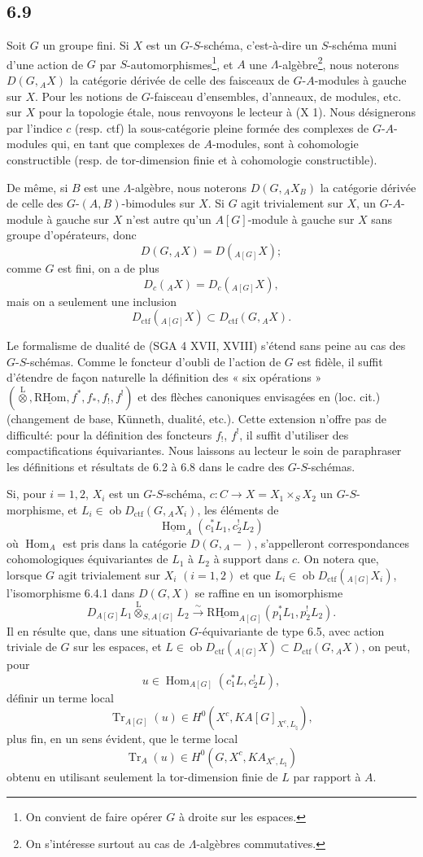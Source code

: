 \documentclass[11pt]{article}
\DeclareMathOperator{\Hom}{Hom}
\providecommand{\RHom}{\mathrm{RHom}}
\providecommand{\uRHom}{\underline{\RHom}}
\providecommand{\uHom}{\underline{\Hom}}
\providecommand{\Tr}{\operatorname{Tr}}
\providecommand{\Tr}{\operatorname{Tr}}
\providecommand{\lten}{\overset{\mathrm L}{\otimes}}
\providecommand{\Ob}{\operatorname{ob}}
\providecommand{\Tr}{\operatorname{Tr}}
\providecommand{\RHom}{\mathrm{RHom}}
\providecommand{\Hom}{\operatorname{Hom}}
\providecommand{\lten}{\overset{\mathrm L}{\otimes}}
\providecommand{\RHom}{\mathrm R\mathcal{H}om}
\providecommand{\lten}{\overset{\mathrm L}{\otimes}}
\providecommand{\Ob}{\operatorname{ob}}
\providecommand{\Tr}{\operatorname{Tr}}
\providecommand{\lten}{\overset{\mathrm L}{\otimes}}
\providecommand{\lten}{\overset{\mathrm L}{\otimes}}
\providecommand{\Ob}{\operatorname{Ob}}
\providecommand{\lten}{\overset{\mathrm L}{\otimes}}
\providecommand{\RHom}{\mathrm{RHom}}
\providecommand{\Hom}{\operatorname{Hom}}
\providecommand{\Tr}{\operatorname{Tr}}
\providecommand{\Ob}{\operatorname{ob}}
\providecommand{\Ob}{\operatorname{Ob}}
\providecommand{\lten}{\overset{\mathrm L}{\otimes}}
\begin{document}
\subsection*{6.9}
Soit $G$ un groupe fini. Si $X$ est un $G$-$S$-schéma, c'est-à-dire un $S$-schéma muni d'une action de $G$ par $S$-automorphismes\footnote{On convient de faire opérer $G$ à droite sur les espaces.}, et $A$ une $\Lambda$-algèbre\footnote{On s'intéresse surtout au cas de $\Lambda$-algèbres commutatives.}, nous noterons $D(G,{}_AX)$ la catégorie dérivée de celle des faisceaux de $G$-$A$-modules à gauche sur $X$. Pour les notions de $G$-faisceau d'ensembles, d'anneaux, de modules, etc. sur $X$ pour la topologie étale, nous renvoyons le lecteur à (X 1). Nous désignerons par l'indice $c$ (resp. ctf) la sous-catégorie pleine formée des complexes de $G$-$A$-modules qui, en tant que complexes de $A$-modules, sont à cohomologie constructible (resp. de tor-dimension finie et à cohomologie constructible).

De même, si $B$ est une $\Lambda$-algèbre, nous noterons $D(G,{}_AX_B)$ la catégorie dérivée de celle des $G$-$(A,B)$-bimodules sur $X$. Si $G$ agit trivialement sur $X$, un $G$-$A$-module à gauche sur $X$ n'est autre qu'un $A[G]$-module à gauche sur $X$ sans groupe d'opérateurs, donc
\[
D(G,{}_AX)=D({}_{A[G]}X);
\]
comme $G$ est fini, on a de plus
\[
D_c({}_AX)=D_c({}_{A[G]}X),
\]
mais on a seulement une inclusion
\[
D_{\mathrm{ctf}}({}_{A[G]}X)\subset D_{\mathrm{ctf}}(G,{}_AX).
\]

Le formalisme de dualité de (SGA 4 XVII, XVIII) s'étend sans peine au cas des $G$-$S$-schémas. Comme le foncteur d'oubli de l'action de $G$ est fidèle, il suffit d'étendre de façon naturelle la définition des « six opérations » $(\lten,\uRHom,f^*,f_*,f_!,f^!)$ et des flèches canoniques envisagées en (loc. cit.) (changement de base, Künneth, dualité, etc.). Cette extension n'offre pas de difficulté: pour la définition des foncteurs $f_!$, $f^!$, il suffit d'utiliser des compactifications équivariantes. Nous laissons au lecteur le soin de paraphraser les définitions et résultats de 6.2 à 6.8 dans le cadre des $G$-$S$-schémas.

Si, pour $i=1,2$, $X_i$ est un $G$-$S$-schéma, $c:C\to X=X_1\times_SX_2$ un $G$-$S$-morphisme, et $L_i\in\Ob D_{\mathrm{ctf}}(G,{}_AX_i)$, les éléments de
\[
\uHom_A(c_1^*L_1,c_2^!L_2)
\]
où $\Hom_A$ est pris dans la catégorie $D(G,{}_A-)$, s'appelleront correspondances cohomologiques équivariantes de $L_1$ à $L_2$ à support dans $c$. On notera que, lorsque $G$ agit trivialement sur $X_i$ $(i=1,2)$ et que $L_i\in\Ob D_{\mathrm{ctf}}({}_{A[G]}X_i)$, l'isomorphisme 6.4.1 dans $D(G,X)$ se raffine en un isomorphisme
\[
D_{A[G]}L_1\lten_{S,A[G]}L_2
\xrightarrow{\sim}
\uRHom_{A[G]}(p_1^*L_1,p_2^!L_2).
\]
Il en résulte que, dans une situation $G$-équivariante de type 6.5, avec action triviale de $G$ sur les espaces, et $L\in\Ob D_{\mathrm{ctf}}({}_{A[G]}X)\subset D_{\mathrm{ctf}}(G,{}_AX)$, on peut, pour
\[
u\in\Hom_{A[G]}(c_1^*L,c_2^!L),
\]
définir un terme local
\[
\Tr_{A[G]}(u)\in H^0(X^c,KA[G]_{X^c,L_{\natural}}),
\]
plus fin, en un sens évident, que le terme local
\[
\Tr_A(u)\in H^0(G,X^c,KA_{X^c,L_{\natural}})
\]
obtenu en utilisant seulement la tor-dimension finie de $L$ par rapport à $A$.
\end{document}
